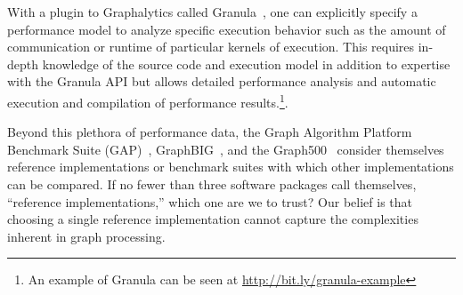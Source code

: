 \documentclass[conference]{IEEEtran}
\begin{document}
With a plugin to Graphalytics called Granula~\cite{Ngai:2015:Granula}, one can explicitly specify a performance model to analyze specific execution behavior such as the amount of communication or runtime of particular kernels of execution. This requires in-depth knowledge of the source code and execution model in addition to expertise with the Granula API but allows detailed performance analysis and automatic execution and compilation of performance results.\footnote{An example of Granula can be seen at \url{http://bit.ly/granula-example}}.

Beyond this plethora of performance data, the Graph Algorithm Platform Benchmark Suite (GAP)~\cite{Beamer:2015:GAPBench}, GraphBIG~\cite{Nai:2015:Graphbig}, and the Graph500~\cite{Murphy:2010:Graph500} consider themselves reference implementations or benchmark suites with which other implementations can be compared. If no fewer than three software packages call themselves, ``reference implementations,'' which one are we to trust? Our belief is that choosing a single reference implementation cannot capture the complexities inherent in graph processing.
\end{document}
